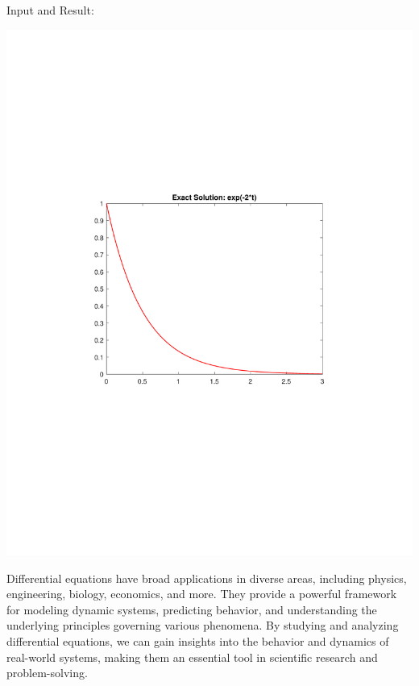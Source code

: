 \documentclass[13pt,a4paper]{report}
\begin{document}
Input and Result:\\[-0.35cm]
\begin{center}
\includegraphics[trim={3.6cm 8.35cm 3.25cm 8cm},clip,scale=0.75]{pdfs/ode.pdf}
\end{center}


Differential equations have broad applications in diverse areas, including physics, engineering, biology, economics, and more. They provide a powerful framework for modeling dynamic systems, predicting behavior, and understanding the underlying principles governing various phenomena. By studying and analyzing differential equations, we can gain insights into the behavior and dynamics of real-world systems, making them an essential tool in scientific research and problem-solving.
\end{document}
